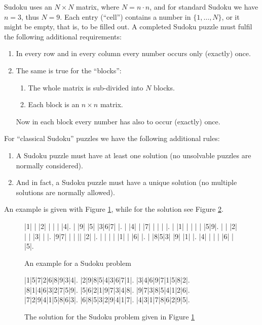 \documentclass[11pt]{report}
\begin{document}
Sudoku uses an $N \times N$ matrix, where $N = n \cdot n$, and for standard Sudoku we have $n = 3$, thus $N = 9$. Each entry (``cell'') contains a number in $\{1, \dots, N\}$, or it might be empty, that is, to be filled out. A completed Sudoku puzzle must fulfil the following additional requirements:
\begin{enumerate}
\item In every row and in every column every number occurs only (exactly) once.
\item The same is true for the ``blocks'':
\begin{enumerate}
\item The whole matrix is sub-divided into $N$ blocks.
\item Each block is an $n \times n$ matrix.
\end{enumerate}
Now in each block every number has also to occur (exactly) once.
\end{enumerate}
For ``classical Sudoku'' puzzles we have the following additional rules:
\begin{enumerate}
\item A Sudoku puzzle must have at least one solution (no unsolvable puzzles are normally considered).
\item And in fact, a Sudoku puzzle must have a unique solution (no multiple solutions are normally allowed).
\end{enumerate}
An example is given with Figure \ref{sudokuEx}, while for the solution see Figure \ref{fig:solutionsudokuEx}.

\begin{figure}[htbp]
\begin{sudoku}
 |1| | |2| | | | |4|.
 | |9| |5| |3|6|7| |.
 | |4| | |7| | | | |.
 | |1| | | | | |5|9|.
 | | |2| | | |3| | |.
 |9|7| | | || |2| |.
 | | | | |1| | |6| |.
 | |8|5|3| |9| |1| |.
 |4| | | | |6| | |5|.
\end{sudoku}
\caption{An example for a Sudoku problem}
\label{sudokuEx}
\end{figure}

\begin{figure}[htbp]
\begin{sudoku}
  |1|5|7|2|6|8|9|3|4|.
  |2|9|8|5|4|3|6|7|1|.
  |3|4|6|9|7|1|5|8|2|.
  |8|1|4|6|3|2|7|5|9|.
  |5|6|2|1|9|7|3|4|8|.
  |9|7|3|8|5|4|1|2|6|.
  |7|2|9|4|1|5|8|6|3|.
  |6|8|5|3|2|9|4|1|7|.
  |4|3|1|7|8|6|2|9|5|.
\end{sudoku}
\caption{The solution for the Sudoku problem given in Figure \ref{sudokuEx}}
\label{fig:solutionsudokuEx}
\end{figure}
\end{document}
